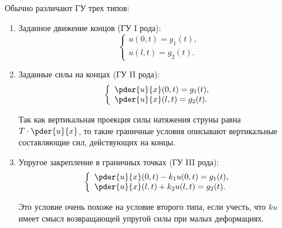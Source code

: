 
Обычно различают ГУ трех типов:
\begin{enumerate}
    \item Заданное движение концов (ГУ I рода):
    \[
        \left\{ \begin{array}{l}
            u(0, t) = g_1(t), \\
            u(l, t) = g_2(t).
        \end{array} \right.
    \]
    
    \item Заданные силы на концах (ГУ II рода):
    \[
        \left\{ \begin{array}{l}
            \ds \pder{u}{x}(0, t) = g_1(t), \\
            \ds \pder{u}{x}(l, t) = g_2(t).
        \end{array} \right.
    \]
    
    Так как вертикальная проекция силы натяжения струны равна \( \ds T\cdot
    \pder{u}{x} \), то такие граничные условия описывают вертикальные
    составляющие сил, действующих на концы.
    
    \item Упругое закрепление в граничных точках (ГУ III рода):
    \[
        \left\{ \begin{array}{l}
            \ds \pder{u}{x}(0, t) - k_1u(0, t) = g_1(t), \\
            \ds \pder{u}{x}(l, t) +k_2u(l,t) = g_2(t).
        \end{array} \right.
    \]
    
    Это условие очень похоже на условие второго типа, если учесть, что \( ku \)
    имеет смысл возвращающей упругой силы при малых деформациях.
\end{enumerate}
\newpage
